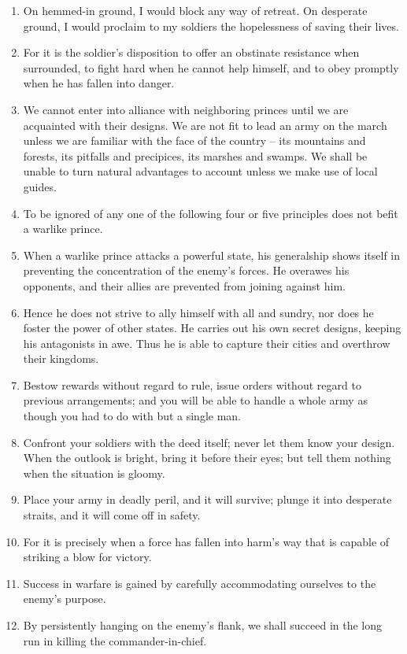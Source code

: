 \documentclass[oneside]{book}
\begin{document}
\begin{enumerate}
	\item On hemmed-in ground, I would block any way of retreat. On desperate ground, I would proclaim to my soldiers the hopelessness of saving their lives.
	\item For it is the soldier's disposition to offer an obstinate resistance when surrounded, to fight hard when he cannot help himself, and to obey promptly when he has fallen into danger.
	\item We cannot enter into alliance with neighboring princes until we are acquainted with their designs. We are not fit to lead an army on the march unless we are familiar with the face of the country – its mountains and forests, its pitfalls and precipices, its marshes and swamps. We shall be unable to turn natural advantages to account unless we make use of local guides.
	\item To be ignored of any one of the following four or five principles does not befit a warlike prince.
	\item When a warlike prince attacks a powerful state, his generalship shows itself in preventing the concentration of the enemy's forces. He overawes his opponents, and their allies are prevented from joining against him.
	\item Hence he does not strive to ally himself with all and sundry, nor does he foster the power of other states. He carries out his own secret designs, keeping his antagonists in awe. Thus he is able to capture their cities and overthrow their kingdoms.
	\item Bestow rewards without regard to rule, issue orders without regard to previous arrangements; and you will be able to handle a whole army as though you had to do with but a single man.
	\item Confront your soldiers with the deed itself; never let them know your design. When the outlook is bright, bring it before their eyes; but tell them nothing when the situation is gloomy.
	\item Place your army in deadly peril, and it will survive; plunge it into desperate straits, and it will come off in safety.
	\item For it is precisely when a force has fallen into harm's way that is capable of striking a blow for victory.
	\item Success in warfare is gained by carefully accommodating ourselves to the enemy's purpose.
	\item By persistently hanging on the enemy's flank, we shall succeed in the long run in killing the commander-in-chief.

\end{enumerate}
\end{document}
